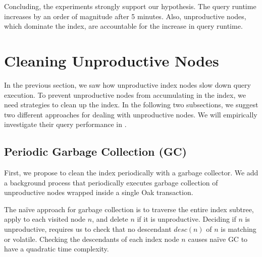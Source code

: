 \documentclass[abstracton,12pt]{scrartcl}
\theoremstyle{definition}
\begin{document}
Concluding, the experiments strongly support our hypothesis. The query runtime
increases by an order of magnitude after 5 minutes. Also, unproductive
nodes, which dominate the index, are accountable for the increase in query runtime. 

\newpage

\section{Cleaning Unproductive Nodes}

In the previous section, we saw how unproductive index nodes slow down query
execution. To prevent unproductive nodes from accumulating in the index, we
need strategies to clean up the index. In the following two subsections, we suggest two
different approaches for dealing with unproductive nodes. We will empirically
investigate their query performance in .

\vspace{-0.3cm}

\subsection{Periodic Garbage Collection (GC)}

\label{sec:gc}

First, we propose to clean the index periodically with a garbage collector.
We add a background process that periodically executes
garbage collection of unproductive nodes wrapped inside 
a single Oak transaction.

The naïve approach for garbage collection is to traverse the entire index subtree,
apply  to each visited node $n$, and delete $n$ if it
is unproductive. Deciding if $n$ is unproductive, requires us to check that no
descendant $desc(n)$ of $n$ is matching or volatile. Checking the descendants of
each index node $n$ causes naïve GC to have a quadratic time complexity.
\end{document}
